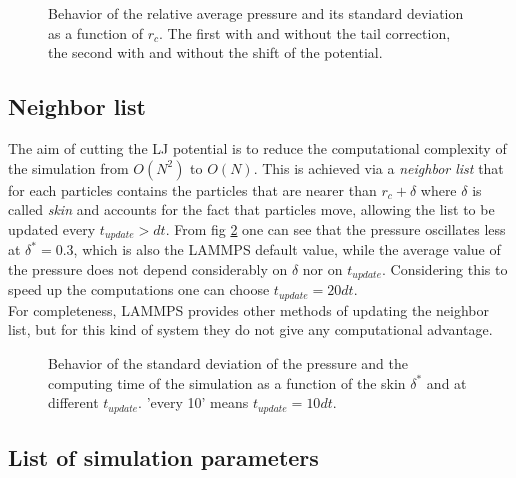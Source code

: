 \documentclass[a4paper, 11pt]{article}
\begin{document}
    \begin{figure}[H]
      \centering
       \hspace{-0.5cm}
      \caption{Behavior of the relative average pressure and its standard deviation as a function of $r_c$. The first with and without the tail correction, the second with and without the shift of the potential.}
      \label{fig:r_c}
    \end{figure}


  \subsection{Neighbor list}
    The aim of cutting the LJ potential is to reduce the computational complexity of the simulation from $O(N^2)$ to $O(N)$. This is achieved via a \emph{neighbor list} that for each particles contains the particles that are nearer than $r_c + \delta$ where $\delta$ is called \emph{skin} and accounts for the fact that particles move, allowing the list to be updated every $t_{update} > dt$.
    From fig \ref{fig:delta} one can see that the pressure oscillates less at $\delta^* = 0.3$, which is also the LAMMPS default value, while the average value of the pressure does not depend considerably on $\delta$ nor on $t_{update}$. Considering this to speed up the computations one can choose $t_{update} = 20 dt$. \\
    For completeness, LAMMPS provides other methods of updating the neighbor list, but for this kind of system they do not give any computational advantage.

    \begin{figure}[H]
      \centering
       \hspace{-0.5cm}
      \caption{Behavior of the standard deviation of the pressure and the computing time of the simulation as a function of the skin $\delta^*$ and at different $t_{update}$. 'every 10' means $t_{update} = 10dt$.}
      \label{fig:delta}
    \end{figure}


  \subsection{List of simulation parameters}
\end{document}
